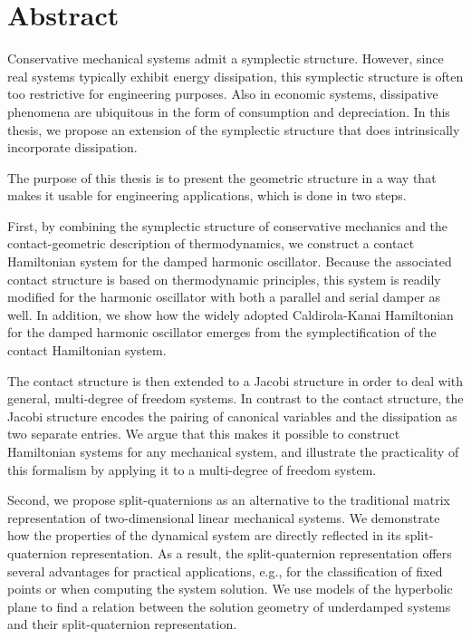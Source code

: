 \chapter*{Abstract}%

Conservative mechanical systems admit a symplectic structure. 
However, since real systems typically exhibit energy dissipation, this symplectic structure is often too restrictive for engineering purposes. 
Also in economic systems, dissipative phenomena are ubiquitous in the form of consumption and depreciation. In this thesis, we propose an extension of the symplectic structure that does intrinsically incorporate dissipation. 

The purpose of this thesis is to present the geometric structure in a way that makes it usable for engineering applications, which is done in two steps.

First, by combining the symplectic structure of conservative mechanics and the contact-geometric description of thermodynamics, we construct a contact Hamiltonian system for the damped harmonic oscillator. 
Because the associated contact structure is based on thermodynamic principles, this system is readily modified for the harmonic oscillator with both a parallel and serial damper as well. 
In addition, we show how the widely adopted Caldirola-Kanai Hamiltonian for the damped harmonic oscillator emerges from the symplectification of the contact Hamiltonian system. 

The contact structure is then extended to a Jacobi structure in order to deal with general, multi-degree of freedom systems.
In contrast to the contact structure, the Jacobi structure encodes the pairing of canonical variables and the dissipation as two separate entries. We argue that this makes it possible to construct Hamiltonian systems for any mechanical system, and illustrate the practicality of this formalism by applying it to a multi-degree of freedom system.

Second, we propose split-quaternions as an alternative to the traditional matrix representation of two-dimensional linear mechanical systems. 
We demonstrate how the properties of the dynamical system are directly reflected in its split-quaternion representation. 
As a result, the split-quaternion representation offers several advantages for practical applications, e.g., for the classification of fixed points or when computing the system solution. 
We use models of the hyperbolic plane to find a relation between the solution geometry of underdamped systems and their split-quaternion representation.
 
 
